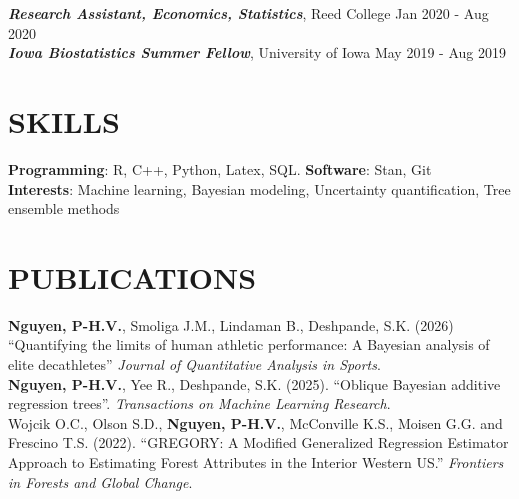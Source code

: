 \documentclass[margin]{res}
\def\pvn{\textbf{Nguyen, P-H.V.}}
\begin{document}
\begin{resume}
\textbf{\emph{Research Assistant, Economics, Statistics}}, Reed College \hfill Jan 2020 - Aug 2020 \\
\textbf{\emph{Iowa Biostatistics Summer Fellow}}, University of Iowa \hfill May 2019 - Aug 2019
\vspace*{-1em}

\section{SKILLS}
\textbf{Programming}: R, C++, Python, Latex, SQL.
\textbf{Software}: Stan, Git \\
\textbf{Interests}: Machine learning, Bayesian modeling,
Uncertainty quantification, Tree ensemble methods
\vspace*{-2em} \\

\section{PUBLICATIONS}
\pvn, Smoliga J.M., Lindaman B., Deshpande, S.K. (2026) ``Quantifying the limits of human athletic performance: A Bayesian analysis of elite decathletes'' 
\textit{Journal of Quantitative Analysis in Sports}. \\
\pvn, Yee R., Deshpande, S.K. (2025). ``Oblique Bayesian additive regression trees''. \textit{Transactions on Machine Learning Research}. \\
Wojcik O.C., Olson S.D., \pvn, McConville K.S., Moisen G.G. and Frescino T.S. (2022). ``GREGORY: A Modified Generalized Regression Estimator Approach to Estimating Forest Attributes in the Interior Western US.'' \textit{Frontiers in Forests and Global Change}.
\vspace*{-1em}




\end{resume}
\end{document}
